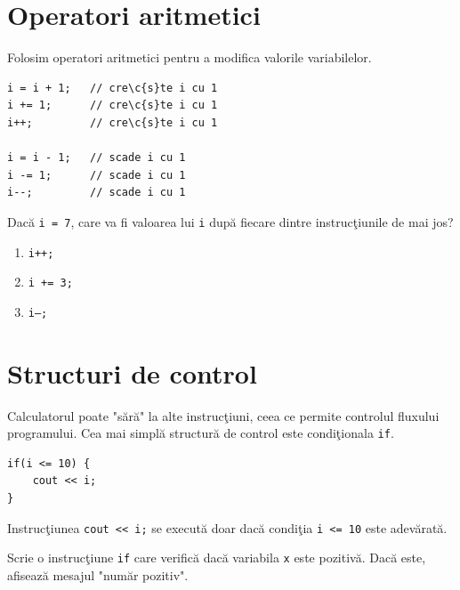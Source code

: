\documentclass[11pt,a4paper]{article}
\begin{document}
\section*{Operatori aritmetici}
Folosim operatori aritmetici pentru a modifica valorile variabilelor.

\begin{examplebox}
\begin{lstlisting}[style=cpp]
i = i + 1;   // cre\c{s}te i cu 1
i += 1;      // cre\c{s}te i cu 1
i++;         // cre\c{s}te i cu 1

i = i - 1;   // scade i cu 1
i -= 1;      // scade i cu 1
i--;         // scade i cu 1
\end{lstlisting}
\end{examplebox}

\begin{tryit}
Dac\u{a} \texttt{i = 7}, care va fi valoarea lui \texttt{i} dup\u{a} fiecare dintre instruc\c{t}iunile de mai jos?
\begin{enumerate}
\item \texttt{i++;}
\item \texttt{i += 3;}
\item \texttt{i--;}
\end{enumerate}
\end{tryit}

\section*{Structuri de control}
Calculatorul poate "s\u{a}r\u{a}" la alte instruc\c{t}iuni, ceea ce permite controlul fluxului programului. Cea mai simpl\u{a} structur\u{a} de control este condi\c{t}ionala \texttt{if}.

\begin{examplebox}
\begin{lstlisting}[style=cpp]
if(i <= 10) {
    cout << i;
}
\end{lstlisting}
Instruc\c{t}iunea \texttt{cout << i;} se execut\u{a} doar dac\u{a} condi\c{t}ia \texttt{i <= 10} este adev\u{a}rat\u{a}.
\end{examplebox}

\begin{tryit}[Condi\c{t}ii]
Scrie o instruc\c{t}iune \texttt{if} care verific\u{a} dac\u{a} variabila \texttt{x} este pozitiv\u{a}. Dac\u{a} este, afiseaz\u{a} mesajul "num\u{a}r pozitiv".
\end{tryit}
\end{document}
